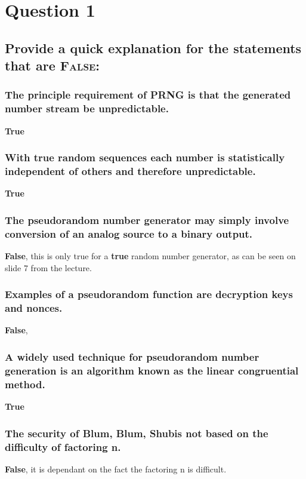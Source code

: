 \documentclass{report}
\begin{document}
	\section{Question 1}
	\startsection
		\renewcommand{\thesubsection}{\thesection.\Alph{subsection}}
		\subsection{Provide a quick explanation for the statements that are \textsc{False}:}
		\startsubsection
			\subsubsection{The principle requirement of PRNG is that the generated number stream be unpredictable.}
			\startsubsection
				\textbf{True}
			\closesection
			\subsubsection{With true random sequences each number is statistically independent of others and therefore unpredictable.}
			\startsubsection
				\textbf{True}
			\closesection
			\subsubsection{The pseudorandom number generator may simply involve conversion of an analog source to a binary output.}
			\startsubsection
				\textbf{False}, this is only true for a \textbf{true} random number generator, as can be seen on slide 7 from the lecture.
			\closesection
			\subsubsection{Examples of a pseudorandom function are decryption keys and nonces.}
			\startsubsection
				\textbf{False}, 
			\closesection
			\subsubsection{A widely used technique for pseudorandom number generation is an algorithm known as the linear congruential method.}
			\startsubsection
				\textbf{True}
			\closesection
			\subsubsection{The security of Blum, Blum, Shubis not based on the difficulty of factoring n.}
			\startsubsection
				\textbf{False}, it is dependant on the fact the factoring n is difficult.
			\closesection
		\closesection
	\closesection
\end{document}
